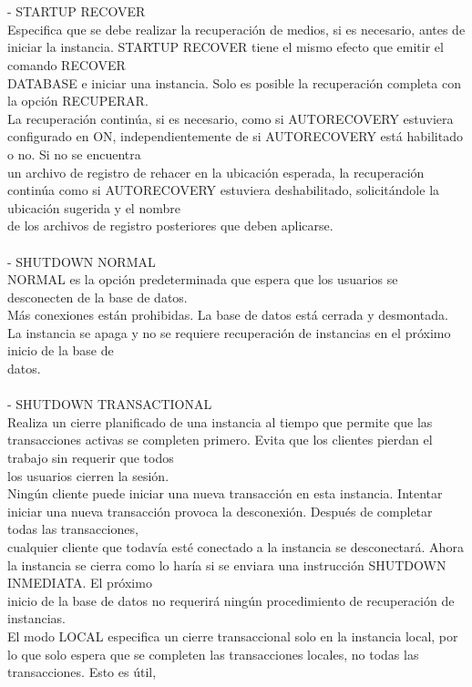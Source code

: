 \begin{enumerate}[1.]
	\\
	\\- STARTUP RECOVER 
	\\Especifica que se debe realizar la recuperación de medios, si es necesario, antes de iniciar la instancia. STARTUP RECOVER tiene el mismo efecto que emitir el comando RECOVER
	 \\DATABASE e iniciar una instancia. Solo es posible la recuperaci\'on completa con la opci\'on RECUPERAR.
	\\La recuperaci\'on contin\'ua, si es necesario, como si AUTORECOVERY estuviera configurado en ON, independientemente de si AUTORECOVERY est\'a habilitado o no. Si no se encuentra 
	\\un archivo de registro de rehacer en la ubicaci\'on esperada, la recuperaci\'on contin\'ua como si AUTORECOVERY estuviera deshabilitado, solicit\'andole la ubicaci\'on sugerida y el nombre 
	\\de los archivos de registro posteriores que deben aplicarse.
	\\
	\\- SHUTDOWN NORMAL 
	\\NORMAL es la opci\'on predeterminada que espera que los usuarios se desconecten de la base de datos.
	\\M\'as conexiones est\'an prohibidas. La base de datos est\'a cerrada y desmontada. La instancia se apaga y no se requiere recuperaci\'on de instancias en el pr\'oximo inicio de la base de 
	\\datos.
	\\
	\\- SHUTDOWN TRANSACTIONAL 
	\\Realiza un cierre planificado de una instancia al tiempo que permite que las transacciones activas se completen primero. Evita que los clientes pierdan el trabajo sin requerir que todos 
	\\los usuarios cierren la sesi\'on.
	\\Ning\'un cliente puede iniciar una nueva transacci\'on en esta instancia. Intentar iniciar una nueva transacci\'on provoca la desconexi\'on. Despu\'es de completar todas las transacciones, 
	\\cualquier cliente que todav\'ia est\'e conectado a la instancia se desconectar\'a. Ahora la instancia se cierra como lo har\'ia si se enviara una instrucción SHUTDOWN INMEDIATA. El pr\'oximo 
	\\inicio de la base de datos no requerir\'a ningún procedimiento de recuperación de instancias.
	\\El modo LOCAL especifica un cierre transaccional solo en la instancia local, por lo que solo espera que se completen las transacciones locales, no todas las transacciones. Esto es \'util, 

\end{enumerate}
